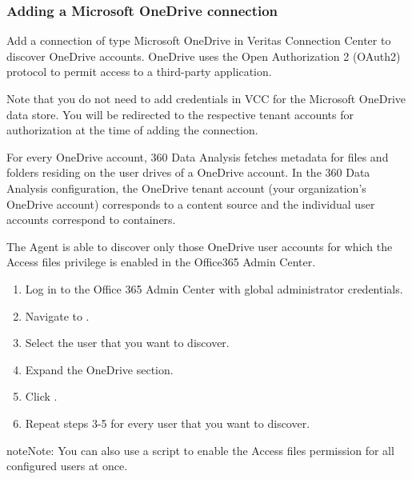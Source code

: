 \documentclass[letterpaper,10pt,english]{sphinxmanual}
\begin{document}
\subsubsection{Adding a Microsoft OneDrive connection}
\label{\detokenize{mcdmp_app_ug:adding-a-microsoft-onedrive-connection}}
Add a connection of type Microsoft OneDrive in Veritas Connection Center to discover OneDrive accounts. OneDrive uses the Open Authorization 2 (OAuth2) protocol to permit access to a third-party application.

Note that you do not need to add credentials in VCC for the Microsoft OneDrive data store. You will be redirected to the respective tenant accounts for authorization at the time of adding the connection.

For every OneDrive account, 360 Data Analysis fetches metadata for files and folders residing on the user drives of a OneDrive account. In the 360 Data Analysis configuration, the OneDrive tenant account (your organization’s OneDrive account) corresponds to a content source and the individual user accounts correspond to containers.


The Agent is able to discover only those OneDrive user accounts for which the Access files privilege is enabled in the Office365 Admin Center.

\begin{enumerate}
\item {} 
Log in to the Office 365 Admin Center with global administrator credentials.

\item {} 
Navigate to .

\item {} 
Select the user that you want to discover.

\item {} 
Expand the OneDrive  section.

\item {} 
Click .

\item {} 
Repeat steps 3-5 for every user that you want to discover.

\end{enumerate}

\begin{sphinxadmonition}{note}{Note:}
You can also use a script to enable the Access files permission for all configured users at once.
\end{sphinxadmonition}
\end{document}
